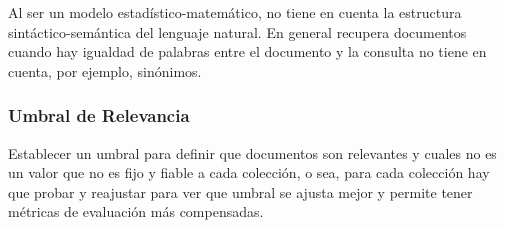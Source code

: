 Al ser un modelo estadístico-matemático, no tiene en cuenta la estructura
sintáctico-semántica del lenguaje natural. En general recupera documentos
cuando hay igualdad de palabras entre el documento y la consulta no tiene en
cuenta, por ejemplo, sinónimos.

\subsubsection{Umbral de Relevancia}

Establecer un umbral para definir que documentos son relevantes y cuales no es
un valor que no es fijo y fiable a cada colección, o sea, para cada colección
hay que probar y reajustar para ver que umbral se ajusta mejor y permite tener
métricas de evaluación más compensadas.

